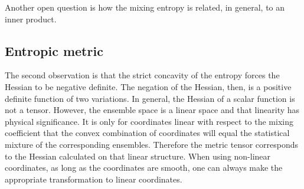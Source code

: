 Another open question is how the mixing entropy is related, in general, to an inner product.

\subsection{Entropic metric}

The second observation is that the strict concavity of the entropy forces the Hessian to be negative definite. The negation of the Hessian, then, is a positive definite function of two variations. In general, the Hessian of a scalar function is not a tensor. However, the ensemble space is a linear space and that linearity has physical significance. It is only for coordinates linear with respect to the mixing coefficient that the convex combination of coordinates will equal the statistical mixture of the corresponding ensembles. Therefore the metric tensor corresponds to the Hessian calculated on that linear structure. When using non-linear coordinates, as long as the coordinates are smooth, one can always make the appropriate transformation to linear coordinates.

